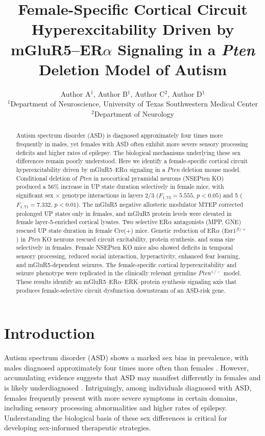 \documentclass[11pt]{article}
\title{Female-Specific Cortical Circuit Hyperexcitability Driven by mGluR5--ER$\alpha$ Signaling in a \textit{Pten} Deletion Model of Autism}
\author{Author A$^{1}$, Author B$^{1}$, Author C$^{2}$, Author D$^{1}$ \\
\small $^{1}$Department of Neuroscience, University of Texas Southwestern Medical Center \\
\small $^{2}$Department of Neurology}
\date{}
\begin{document}
\maketitle

\begin{abstract}
Autism spectrum disorder (ASD) is diagnosed approximately four times more frequently in males, yet females with ASD often exhibit more severe sensory processing deficits and higher rates of epilepsy. The biological mechanisms underlying these sex differences remain poorly understood. Here we identify a female-specific cortical circuit hyperexcitability driven by mGluR5--ER$\alpha$ signaling in a \textit{Pten} deletion mouse model. Conditional deletion of \textit{Pten} in neocortical pyramidal neurons (NSEPten KO) produced a 56\% increase in UP state duration selectively in female mice, with significant sex $\times$ genotype interactions in layers 2/3 ($F_{1,73} = 5.555$, $p < 0.05$) and 5 ($F_{1,71} = 7.332$, $p < 0.01$). The mGluR5 negative allosteric modulator MTEP corrected prolonged UP states only in females, and mGluR5 protein levels were elevated in female layer-5-enriched cortical lysates. Two selective ER$\alpha$ antagonists (MPP, GNE) rescued UP state duration in female Cre(+) mice. Genetic reduction of ER$\alpha$ (Esr1$^{fl/+}$) in \textit{Pten} KO neurons rescued circuit excitability, protein synthesis, and soma size selectively in females. Female NSEPten KO mice also showed deficits in temporal sensory processing, reduced social interaction, hyperactivity, enhanced fear learning, and mGluR5-dependent seizures. The female-specific cortical hyperexcitability and seizure phenotype were replicated in the clinically relevant germline \textit{Pten}$^{+/-}$ model. These results identify an mGluR5--ER$\alpha$--ERK--protein synthesis signaling axis that produces female-selective circuit dysfunction downstream of an ASD-risk gene.
\end{abstract}

\section{Introduction}

Autism spectrum disorder (ASD) shows a marked sex bias in prevalence, with males diagnosed approximately four times more often than females \citep{loomes2017}. However, accumulating evidence suggests that ASD may manifest differently in females and is likely underdiagnosed \citep{werling2013}. Intriguingly, among individuals diagnosed with ASD, females frequently present with more severe symptoms in certain domains, including sensory processing abnormalities and higher rates of epilepsy. Understanding the biological basis of these sex differences is critical for developing sex-informed therapeutic strategies.
\end{document}
